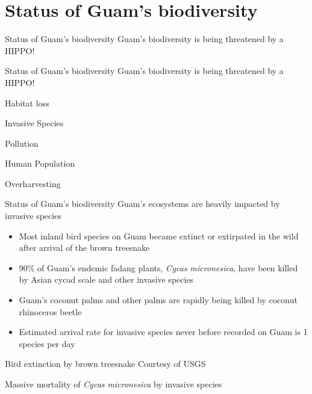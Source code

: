 \documentclass[]{beamer}
\begin{document}
\section{Status of Guam's biodiversity}

\begin{frame}{Status of Guam's biodiversity}
    Guam's biodiversity is being threatened by a HIPPO!
\end{frame}

\begin{frame}{Status of Guam's biodiversity}
    Guam's biodiversity is being threatened by a HIPPO!
    \begin{description}[align=left]
        \item [\texttt{H}] Habitat loss
        \item [\texttt{I}] Invasive Species
        \item [\texttt{P}] Pollution 
        \item [\texttt{P}] Human Population
        \item [\texttt{O}] Overharvesting
    \end{description}
\end{frame}

\begin{frame}{Status of Guam's biodiversity}
Guam's ecosystems are heavily impacted by invasive species
\begin{itemize}
\item Most inland bird species on Guam became extinct or extirpated in the wild after arrival of the brown treesnake
\item 90\%  of Guam's endemic fadang plants, \textit{Cycas micronesica}, have been killed by Asian cycad scale and other invasive species
\item Guam's coconut palms and other palms are rapidly being killed by coconut rhinoceros beetle
\item Estimated arrival rate for invasive species never before recorded on Guam is 1 species per day
\end{itemize}
\end{frame}

\begin{frame}{Bird extinction by brown treesnake}
    \tiny{Courtesy of USGS}
\end{frame}

\begin{frame}{Massive mortality of \textit{Cycas micronesica} by invasive species}
\end{frame}
\end{document}
